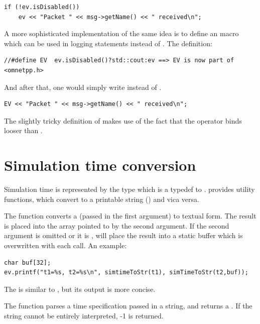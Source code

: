 \begin{verbatim}
if (!ev.isDisabled())
    ev << "Packet " << msg->getName() << " received\n";
\end{verbatim}

A more sophisticated implementation of the same idea is to define
an  macro which can be used in logging statements instead of
. The definition:

\begin{verbatim}
//#define EV  ev.isDisabled()?std::cout:ev ==> EV is now part of <omnetpp.h>
\end{verbatim}

And after that, one would simply write  instead of .

\begin{verbatim}
EV << "Packet " << msg->getName() << " received\n";
\end{verbatim}

The slightly tricky definition of  makes use of the fact
that the \ttt{<<} operator binds looser than .



\section{Simulation time conversion}

Simulation time is represented by the type 
which is a typedef to .
{\opp} provides utility functions, which convert 
to a printable string () and vica versa.

The  function converts a 
(passed in the first argument) to textual form. The result is placed into
the  array pointed to by the second argument. If the second argument is omitted
or it is ,  will place the result into a
static buffer which is overwritten with each call. An example:

\begin{verbatim}
char buf[32];
ev.printf("t1=%s, t2=%s\n", simtimeToStr(t1), simTimeToStr(t2,buf));
\end{verbatim}

The  is similar to ,
but its output is more concise.

The  function parses a time specification passed
in a string, and returns a . If the string cannot
be entirely interpreted, -1 is returned.

